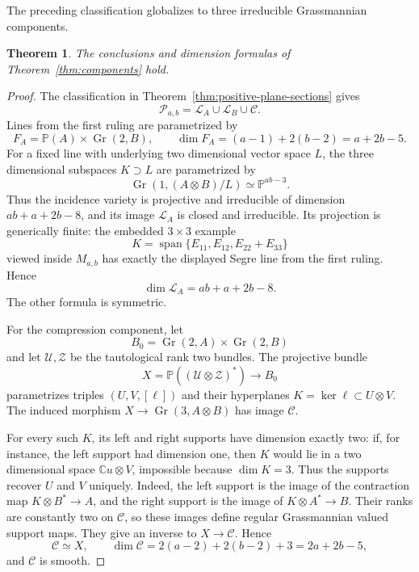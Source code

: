 \documentclass[11pt]{amsart}
\newcommand{\chg}[1]{#1}
\newcommand{\Gr}{\operatorname{Gr}}
\newcommand{\Span}{\operatorname{span}}
\theoremstyle{plain}
\newtheorem{theorem}{Theorem}[section]
\theoremstyle{definition}
\theoremstyle{remark}
\begin{document}
\chg{The preceding classification globalizes to three irreducible Grassmannian components.}

\begin{theorem}\label{thm:global-components}
The conclusions and dimension formulas of Theorem~\ref{thm:components} hold.
\end{theorem}

\begin{proof}
The classification in Theorem~\ref{thm:positive-plane-sections} gives
\[
\mathcal P_{a,b}=\mathcal L_A\cup\mathcal L_B\cup\mathcal C.
\]
Lines from the first ruling are parametrized by
\[
F_A=\mathbb P(A)\times\Gr(2,B),
\qquad
\dim F_A=(a-1)+2(b-2)=a+2b-5.
\]
For a fixed line with underlying \chg{two dimensional} vector space $L$, the \chg{three dimensional} subspaces $K\supset L$ are parametrized by
\[
\Gr(1,(A\otimes B)/L)\simeq\mathbb P^{ab-3}.
\]
Thus the incidence variety is projective and irreducible of dimension $ab+a+2b-8$, and its image $\mathcal L_A$ is closed and irreducible. Its projection is generically finite: the embedded $3\times3$ example
\[
K=\Span\{E_{11},E_{12},E_{22}+E_{33}\}
\]
viewed inside $M_{a,b}$ has exactly the displayed Segre line from the first ruling. Hence
\[
\dim\mathcal L_A=ab+a+2b-8.
\]
The other formula is symmetric.

For the compression component, let
\[
B_0=\Gr(2,A)\times\Gr(2,B)
\]
and let $\mathcal U,\mathcal Z$ be the tautological rank two bundles. The projective bundle
\[
X=\mathbb P((\mathcal U\otimes\mathcal Z)^*)\longrightarrow B_0
\]
parametrizes triples $(U,V,[\ell])$ and their hyperplanes $K=\ker\ell\subset U\otimes V$. The induced morphism $X\to\Gr(3,A\otimes B)$ has image $\mathcal C$.

For every such $K$, its left and right supports have dimension exactly two: if, for instance, the left support had dimension one, then $K$ would lie in a \chg{two dimensional} space $\mathbb Cu\otimes V$, impossible because $\dim K=3$. Thus the supports recover $U$ and $V$ uniquely. Indeed, the left support is the image of the contraction map $K\otimes B^*\to A$, and the right support is the image of $K\otimes A^*\to B$. Their ranks are constantly two on $\mathcal C$, so these images define regular \chg{Grassmannian valued} support maps. They give an inverse to $X\to\mathcal C$. Hence
\[
\mathcal C\simeq X,
\qquad
\dim\mathcal C=2(a-2)+2(b-2)+3=2a+2b-5,
\]
and $\mathcal C$ is smooth.


\end{proof}
\end{document}
